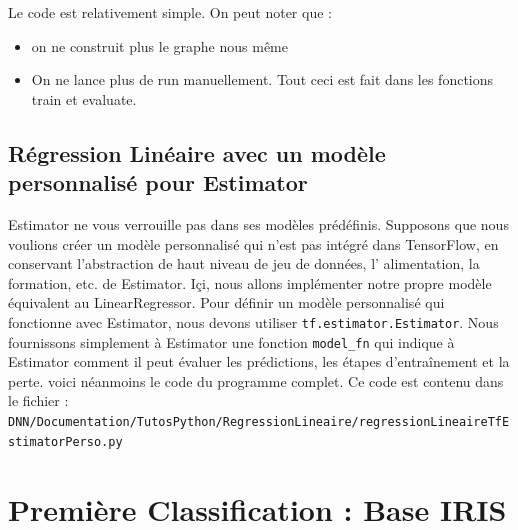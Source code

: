 \documentclass[a4paper,11pt]{book}
\begin{document}
Le code est relativement simple. On peut noter que :
\begin{itemize}
\item on ne construit plus le graphe nous même
\item On ne lance plus de run manuellement. Tout ceci est fait dans les fonctions train et evaluate.
\end{itemize}

\section{Régression Linéaire avec un modèle personnalisé pour Estimator}
Estimator ne vous verrouille pas dans ses modèles prédéfinis. Supposons que nous voulions créer un modèle personnalisé qui n'est pas intégré dans TensorFlow, en conservant  l'abstraction de haut niveau de jeu de données, l' alimentation, la formation, etc. de Estimator. Içi, nous allons implémenter notre propre modèle équivalent au LinearRegressor.
Pour définir un modèle personnalisé qui fonctionne avec Estimator, nous devons utiliser \verb+tf.estimator.Estimator+.  Nous fournissons simplement à Estimator une fonction \verb+model_fn+ qui indique à Estimator comment il peut évaluer les prédictions, les étapes d'entraînement et la perte. voici néanmoins le code du programme complet. Ce code est contenu dans le fichier :\\
\verb+DNN/Documentation/TutosPython/RegressionLineaire/regressionLineaireTfEstimatorPerso.py+



\chapter{Première Classification : Base IRIS}
\end{document}
